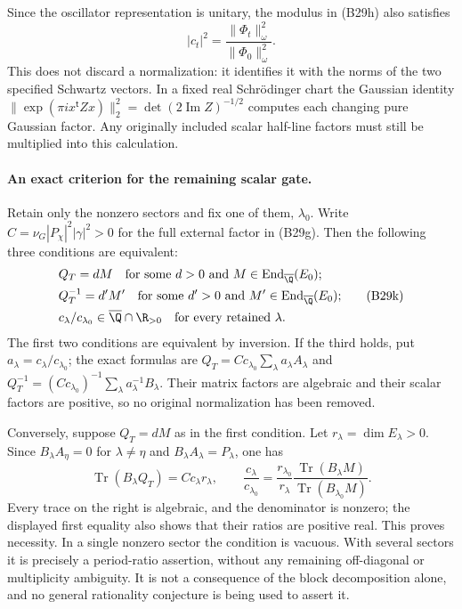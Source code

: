 Since the oscillator representation is unitary,
the modulus in (B29h) also satisfies
\[
                |c_t|^2=
                   \frac{\|\Phi_t\|_\omega^2}
                        {\|\Phi_0\|_\omega^2}.
 \tag{B29j}
\]
This does not discard a normalization: it identifies
it with the norms of the two specified Schwartz
vectors.  In a fixed real Schr\"odinger chart the
Gaussian identity
$\|\exp(\pi i x^{\mathsf t}Zx)\|_2^2
 =\det(2\operatorname{Im}Z)^{-1/2}$
computes each changing pure Gaussian factor.
Any originally included scalar half-line factors
must still be multiplied into this calculation.

\paragraph{An exact criterion for the remaining scalar gate.}
Retain only the nonzero sectors and fix one of them,
$\lambda_0$.  Write
$C=\nu_G|P_\chi|^2|\gamma|^2>0$ for the full
external factor in (B29g).  Then the following three
conditions are equivalent:
\[
 \begin{aligned}
 &Q_T=dM\quad\hbox{for some }d>0
                 \hbox{ and }M\in\operatorname{End}_{\overline\Q}(E_0);\\
 &Q_T^{-1}=d'M'\quad\hbox{for some }d'>0
                 \hbox{ and }M'\in\operatorname{End}_{\overline\Q}(E_0);\\
 &c_\lambda/c_{\lambda_0}\in
          \overline\Q\cap\R_{>0}\quad\hbox{for every retained }\lambda.
 \end{aligned}
 \tag{B29k}
\]
The first two conditions are equivalent by inversion.
If the third holds, put
$a_\lambda=c_\lambda/c_{\lambda_0}$; the exact formulas are
$Q_T=Cc_{\lambda_0}\sum_\lambda a_\lambda A_\lambda$
and
$Q_T^{-1}=(Cc_{\lambda_0})^{-1}
\sum_\lambda a_\lambda^{-1}B_\lambda$.
Their matrix factors are algebraic and their scalar
factors are positive, so no original normalization
has been removed.

Conversely, suppose $Q_T=dM$ as in the first condition.
Let $r_\lambda=\dim E_\lambda>0$.  Since
$B_\lambda A_\eta=0$ for $\lambda\ne\eta$ and
$B_\lambda A_\lambda=P_\lambda$, one has
\[
 \operatorname{Tr}(B_\lambda Q_T)=Cc_\lambda r_\lambda,
 \qquad
 \frac{c_\lambda}{c_{\lambda_0}}
   =\frac{r_{\lambda_0}}{r_\lambda}
      \frac{\operatorname{Tr}(B_\lambda M)}
           {\operatorname{Tr}(B_{\lambda_0}M)}.
 \tag{B29l}
\]
Every trace on the right is algebraic, and the
denominator is nonzero; the displayed first equality
also shows that their ratios are positive real.
This proves necessity.  In a single nonzero sector
the condition is vacuous.  With several sectors it
is precisely a period-ratio assertion, without any
remaining off-diagonal or multiplicity ambiguity.
It is not a consequence of the block decomposition
alone, and no general rationality conjecture is
being used to assert it.

